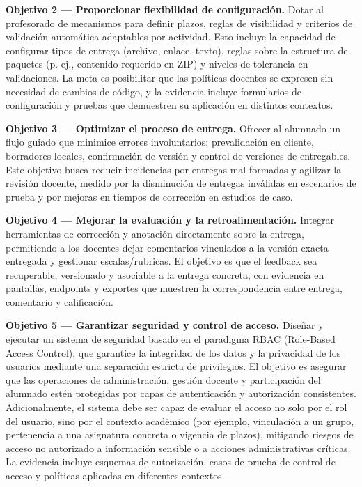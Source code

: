 \textbf{Objetivo 2 — Proporcionar flexibilidad de configuraci\'on.} Dotar al profesorado de mecanismos para definir plazos, reglas de visibilidad y criterios de validaci\'on autom\'atica adaptables por actividad. Esto incluye la capacidad de configurar tipos de entrega (archivo, enlace, texto), reglas sobre la estructura de paquetes (p. ej., contenido requerido en ZIP) y niveles de tolerancia en validaciones. La meta es posibilitar que las pol\'iticas docentes se expresen sin necesidad de cambios de c\'odigo, y la evidencia incluye formularios de configuraci\'on y pruebas que demuestren su aplicaci\'on en distintos contextos.

\textbf{Objetivo 3 — Optimizar el proceso de entrega.} Ofrecer al alumnado un flujo guiado que minimice errores involuntarios: prevalidaci\'on en cliente, borradores locales, confirmaci\'on de versi\'on y control de versiones de entregables. Este objetivo busca reducir incidencias por entregas mal formadas y agilizar la revisi\'on docente, medido por la disminuci\'on de entregas inv\'alidas en escenarios de prueba y por mejoras en tiempos de correcci\'on en estudios de caso.

\textbf{Objetivo 4 — Mejorar la evaluaci\'on y la retroalimentaci\'on.} Integrar herramientas de correcci\'on y anotaci\'on directamente sobre la entrega, permitiendo a los docentes dejar comentarios vinculados a la versi\'on exacta entregada y gestionar escalas/rubricas. El objetivo es que el feedback sea recuperable, versionado y asociable a la entrega concreta, con evidencia en pantallas, endpoints y exportes que muestren la correspondencia entre entrega, comentario y calificaci\'on.

\textbf{Objetivo 5 — Garantizar seguridad y control de acceso.} Dise\~nar y ejecutar un sistema de seguridad basado en el paradigma RBAC (Role-Based Access Control), que garantice la integridad de los datos y la privacidad de los usuarios mediante una separaci\'on estricta de privilegios. El objetivo es asegurar que las operaciones de administraci\'on, gesti\'on docente y participaci\'on del alumnado est\'en protegidas por capas de autenticaci\'on y autorizaci\'on consistentes. Adicionalmente, el sistema debe ser capaz de evaluar el acceso no solo por el rol del usuario, sino por el contexto acad\'emico (por ejemplo, vinculaci\'on a un grupo, pertenencia a una asignatura concreta o vigencia de plazos), mitigando riesgos de acceso no autorizado a informaci\'on sensible o a acciones administrativas cr\'iticas. La evidencia incluye esquemas de autorizaci\'on, casos de prueba de control de acceso y pol\'iticas aplicadas en diferentes contextos.

